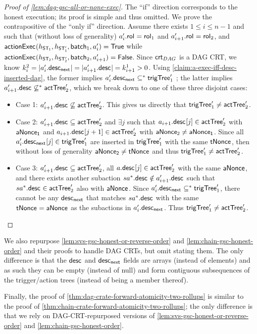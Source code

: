 \begin{proof}[Proof of \cref{lem:dag-gsc-all-or-none-exec}]
    The ``if'' direction corresponds to the honest execution; its proof is simple and thus omitted. We prove the contrapositive of the ``only if'' direction. Assume there exists $1 \leq i \leq n-1$ and such that (without loss of generality)  $a_{i}'.\mathsf{rol}_{} = \mathsf{rol}_{1}$ and $a_{i + 1}'.\mathsf{rol}_{} = \mathsf{rol}_{2}$, and $\mathsf{actionExec}_{}(h_{\mathsf{ST_{1}}}, h_{\mathsf{ST_{1}'}}, \mathsf{batch}_{1}, a_{i}') = \mathsf{True}  $ while $\mathsf{actionExec}_{}(h_{\mathsf{ST_{2}}}, h_{\mathsf{ST_{2}'}}, \mathsf{batch}_{2}, a_{i+1}') = \mathsf{False}$. Since $\mathsf{crt}_{DAG}$ is a DAG CRT, we know $k_i^2 = |a_i'.\mathsf{desc_{next}}_{} | =|a_{i+1}'.\mathsf{desc}_{}| = k_{i+1}^1 > 0$.
    Using \cref{claim:a-exec-iff-desc-inserted-dag}, the former implies $a_{i}'.\mathsf{desc_{next}}_{} \subseteq^* \mathsf{trigTree}_{1}'$ ; the latter implies $a_{i+1}'.\mathsf{desc}_{} \not \subseteq^* \mathsf{actTree}_{2}'$, which we break down to one of these three disjoint cases:
    \begin{itemize}
        \item Case 1: $a_{i+1}'.\mathsf{desc}_{} \not \subseteq \mathsf{actTree}_{2}'$. This gives us directly that $\mathsf{trigTree}_{1}' \neq \mathsf{actTree}_{2}'$.
        
        \item Case 2: $a_{i+1}'.\mathsf{desc}_{} \subseteq \mathsf{actTree}_{2}'$ and  $\exists j$ such that $a_{i+1}.\mathsf{desc}_{}[j] \in \mathsf{actTree}_{2}'$ with $\mathsf{aNonce_{1}}$ and $a_{i+1}.\mathsf{desc}_{}[j+1] \in \mathsf{actTree}_{2}'$ with $\mathsf{aNonce_{2}} \neq \mathsf{aNonce_{1}}$. Since all $a_i'.\mathsf{desc_{next}}_{}[j] \in \mathsf{trigTree}_{1}'$ are inserted in $\mathsf{trigTree}_{1}'$ with the same $\mathsf{tNonce_{}}$, then without loss of generality $\mathsf{aNonce_{2}} \neq \mathsf{tNonce_{}}$ and thus $\mathsf{trigTree}_{1}' \neq \mathsf{actTree}_{2}'$.
        
        \item Case 3: $a_{i+1}'.\mathsf{desc}_{} \subseteq \mathsf{actTree}_{2}'$, all $a.\mathsf{desc}_{}[j] \in \mathsf{actTree}_{2}'$ with the same $\mathsf{aNonce_{}}$, and there exists another subaction $sa^*.\mathsf{desc}_{} \notin a_{i+1}'.\mathsf{desc}_{}$ such that $sa^*.\mathsf{desc}_{} \in \mathsf{actTree}_{2}'$ also with $\mathsf{aNonce_{}}$. Since $a_{i}'.\mathsf{desc_{next}}_{} \subseteq^* \mathsf{trigTree}_{1}'$, there cannot be any $\mathsf{desc_{next}}_{}$ that matches $sa^*.\mathsf{desc}_{}$ with the same $\mathsf{tNonce_{}} = \mathsf{aNonce_{}}$ as the subactions in $a_{i}'.\mathsf{desc_{next}}_{}$. Thus $\mathsf{trigTree}_{1}' \neq \mathsf{actTree}_{2}'$.
    \end{itemize}
    
\end{proof}

We also repurpose \cref{lem:svs-gsc-honest-or-reverse-order} and \cref{lem:chain-gsc-honest-order} and their proofs to handle DAG CRTs, but omit stating them. The only difference is that the $\mathsf{desc}_{}$ and $\mathsf{desc_{next}}_{}$ fields are arrays (instead of elements) and as such they can be empty (instead of null) and form contiguous subsequences of the trigger/action trees (instead of being a member thereof).



Finally, the proof of \cref{thm:dag-crate-forward-atomicity-two-rollups} is similar to the proof of \cref{thm:chain-crate-forward-atomicity-two-rollups}; the only difference is that we rely on DAG-CRT-repurposed versions of \cref{lem:svs-gsc-honest-or-reverse-order} and \cref{lem:chain-gsc-honest-order}.
